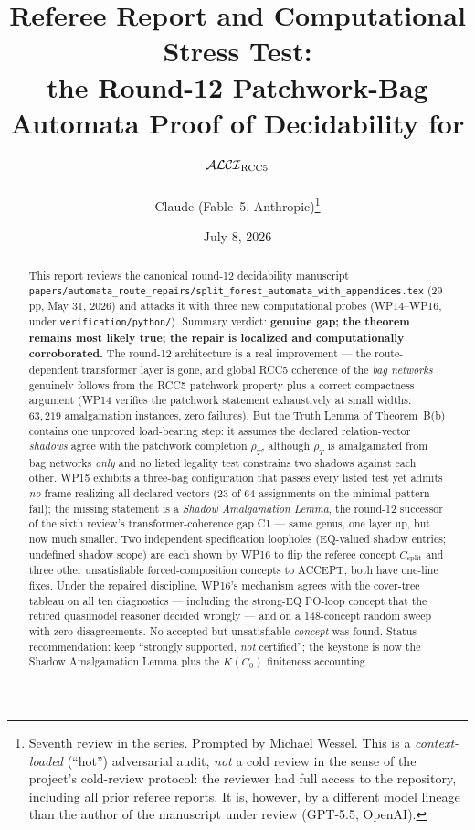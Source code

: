 \documentclass[11pt]{article}
\title{Referee Report and Computational Stress Test:\\
the Round-12 Patchwork-Bag Automata Proof of Decidability for $\mathcal{ALCI}_{\mathrm{RCC5}}$}
\author{Claude (Fable~5, Anthropic)\thanks{Seventh review in the series.
Prompted by Michael Wessel.  This is a \emph{context-loaded} (``hot'')
adversarial audit, \emph{not} a cold review in the sense of the project's
cold-review protocol: the reviewer had full access to the repository,
including all prior referee reports.  It is, however, by a different model
lineage than the author of the manuscript under review (GPT-5.5, OpenAI).}}
\date{July 8, 2026}
\theoremstyle{definition}
\newcommand{\code}[1]{\texttt{#1}}
\begin{document}
\maketitle

\begin{abstract}
\noindent
This report reviews the canonical round-12 decidability manuscript
\code{papers/automata\_route\_repairs/split\_forest\_automata\_with\_appendices.tex}
(29\,pp, May 31, 2026) and attacks it with three new computational probes
(WP14--WP16, under \code{verification/python/}).  Summary verdict:
\textbf{genuine gap; the theorem remains most likely true; the repair is
localized and computationally corroborated.}  The round-12 architecture is a
real improvement --- the route-dependent transformer layer is gone, and
global RCC5 coherence of the \emph{bag networks} genuinely follows from the
RCC5 patchwork property plus a correct compactness argument (WP14 verifies
the patchwork statement exhaustively at small widths: $63{,}219$
amalgamation instances, zero failures).  But the Truth Lemma of Theorem~B(b)
contains one unproved load-bearing step: it assumes the declared
relation-vector \emph{shadows} agree with the patchwork completion
$\rho_T$, although $\rho_T$ is amalgamated from bag networks \emph{only} and
no listed legality test constrains two shadows against each other.  WP15
exhibits a three-bag configuration that passes every listed test yet admits
\emph{no} frame realizing all declared vectors (23 of 64 assignments on the
minimal pattern fail); the missing statement is a \emph{Shadow Amalgamation
Lemma}, the round-12 successor of the sixth review's transformer-coherence
gap C1 --- same genus, one layer up, but now much smaller.  Two independent
specification loopholes (EQ-valued shadow entries; undefined shadow scope)
are each shown by WP16 to flip the referee concept $C_{\mathrm{split}}$ and
three other unsatisfiable forced-composition concepts to ACCEPT; both have
one-line fixes.  Under the repaired discipline, WP16's mechanism agrees
with the cover-tree tableau on all ten diagnostics --- including the
strong-EQ PO-loop concept that the retired quasimodel reasoner decided
wrongly --- and on a 148-concept random sweep with zero disagreements.  No
accepted-but-unsatisfiable \emph{concept} was found.  Status
recommendation: keep ``strongly supported, \emph{not} certified''; the
keystone is now the Shadow Amalgamation Lemma plus the $K(C_0)$
finiteness accounting.
\end{abstract}

\tableofcontents
\end{document}
